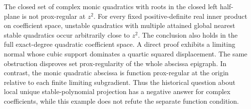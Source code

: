 The closed set of complex monic quadratics with roots in the closed left half-plane
is not prox-regular at $z^2$. For every fixed positive-definite real inner product
on coefficient space, unstable quadratics with multiple attained global nearest
stable quadratics occur arbitrarily close to $z^2$. The conclusion also holds in
the full exact-degree quadratic coefficient space. A direct proof exhibits a
limiting normal whose cubic support dominates a quartic squared displacement.
The same obstruction disproves set prox-regularity of the whole abscissa epigraph.
In contrast, the monic quadratic abscissa is function prox-regular at the origin
relative to each finite limiting subgradient. Thus the historical question about
local unique stable-polynomial projection has a negative answer for complex
coefficients, while this example does not refute the separate function condition.
